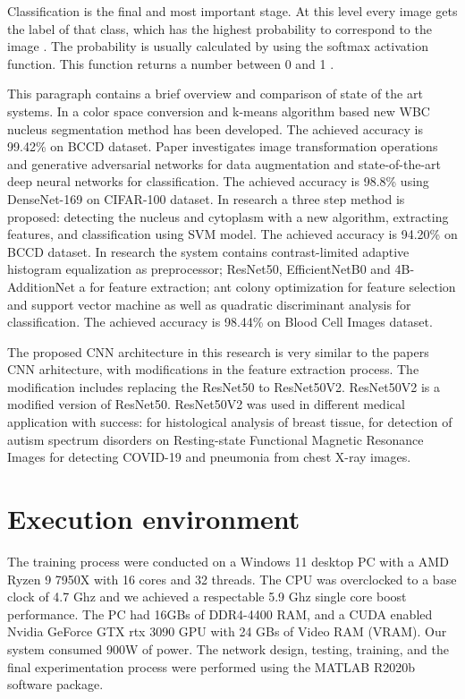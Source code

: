 \documentclass[conference]{IEEEtran}
\begin{document}
Classification is the final and most important stage. At this level every image gets the label of that class, which has the highest probability to correspond to the image \cite{b17}. 
The probability is usually calculated by using the softmax activation function. This function returns a number between 0 and 1 \cite{b18}. 

This paragraph contains a brief overview and comparison of state of the art systems.  
In \cite{b19} a color space conversion and k-means algorithm based new WBC nucleus segmentation method has been developed. The achieved accuracy is 99.42\% on BCCD dataset.
Paper \cite{b20} investigates image transformation operations and generative adversarial networks for data augmentation and state-of-the-art deep neural networks for classification. The achieved accuracy is 98.8\% using DenseNet-169 on CIFAR-100 dataset.
In \cite{b21} research a three step method is proposed: detecting the nucleus and cytoplasm with a new algorithm, extracting features, and classification using SVM model. The achieved accuracy is 94.20\% on BCCD dataset.
In \cite{b5} research the system contains contrast-limited adaptive histogram equalization as preprocessor; ResNet50, EfficientNetB0 and 4B-AdditionNet a for feature extraction; 
ant colony optimization for feature selection and support vector machine as well as quadratic discriminant analysis for classification. The achieved accuracy is 98.44\% on Blood Cell Images dataset.

The proposed CNN architecture in this research is very similar to the \cite{b5} papers CNN arhitecture, with modifications in the feature extraction process. 
The modification includes replacing the ResNet50 to ResNet50V2. ResNet50V2 is a modified version of ResNet50. ResNet50V2 was used in different medical application with success: 
\cite{b22} for histological analysis of breast tissue, \cite{b23} for detection of autism spectrum disorders on Resting-state Functional Magnetic Resonance Images 
\cite{b6} for detecting COVID-19 and pneumonia from chest X-ray images.




\section{Execution environment}
The training process were conducted on a Windows 11 desktop PC with a AMD Ryzen 9 7950X with 16 cores and 32 threads. The CPU was overclocked to a base clock of 4.7 Ghz and we achieved a respectable 5.9 Ghz single core boost performance. The PC had 16GBs of DDR4-4400 RAM, and a CUDA enabled Nvidia GeForce GTX rtx 3090 GPU with 24 GBs of Video RAM (VRAM). Our system consumed 900W of power. The network design, testing, training, and the final experimentation process were performed using the MATLAB R2020b software package.
\end{document}
